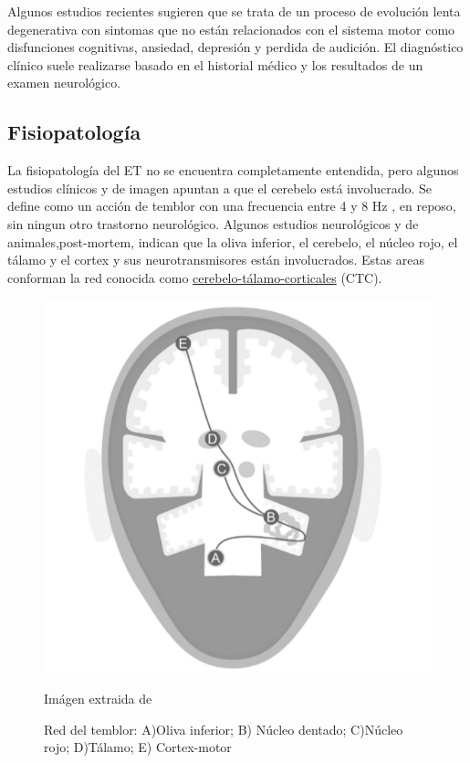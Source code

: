 Algunos estudios recientes sugieren que se trata de un proceso de evolución lenta degenerativa con sintomas que no están relacionados con el sistema motor como disfunciones cognitivas, ansiedad, depresión y perdida de audición.
El diagnóstico clínico suele realizarse basado en el historial médico y los resultados de un examen neurológico. \cite{movedisorder}

\subsection{Fisiopatología}

La fisiopatología del ET no se encuentra completamente entendida, pero algunos estudios clínicos y de imagen apuntan a que el cerebelo está involucrado. Se define como un acción de temblor con una frecuencia entre 4 y 8 Hz \cite{anderson}, en reposo, sin ningun otro trastorno neurológico.
Algunos estudios neurológicos y de animales,post-mortem, indican que la oliva inferior, el cerebelo, el núcleo rojo, el tálamo y el cortex y sus neurotransmisores están involucrados. Estas areas conforman la red conocida como \hyperref[te:cerebelo-talamo-cortex]{cerebelo-tálamo-corticales} (CTC).\cite{rolectc,neuessentialsinet, anderson}

\begin{figure}[H]
  \centering
    \includegraphics[scale=0.5]{img/cerebelo-talamo-cortex.png}
  \caption{Red del temblor: A)Oliva inferior; B) Núcleo dentado; C)Núcleo rojo; D)Tálamo; E) Cortex-motor} Imágen extraida de \cite{neuessentialsinet}    \label{et:cerebelo-talamo-cortex}
\end{figure}

